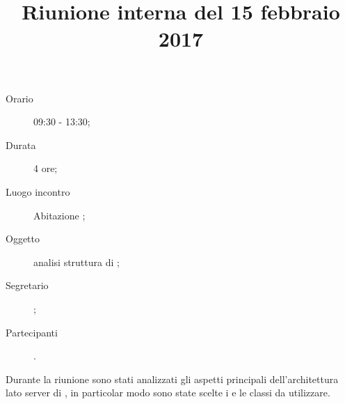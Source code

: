 


\author{\LS}
\supervisor{\LB}
\title{Riunione interna del 15 febbraio 2017}



\maketitle

\begin{description}
	\item[Orario] 09:30 - 13:30;
	\item[Durata] 4 ore;
	\item[Luogo incontro] Abitazione \GG;
	\item[Oggetto] analisi struttura  di \proj{};
	\item[Segretario] \LS; 
	\item[Partecipanti] \ALL.
\end{description}
Durante la riunione sono stati analizzati gli aspetti principali dell'architettura lato server di \proj{}, in particolar modo sono state scelte i  e le classi da utilizzare.

